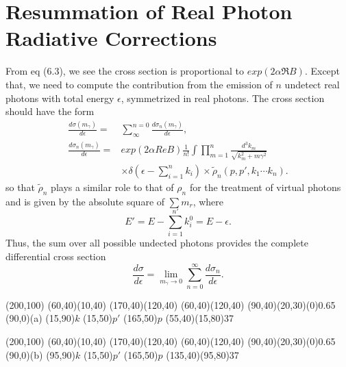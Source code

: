 \section{Resummation of Real Photon Radiative Corrections}
From eq (6.3), we see the cross section is proportional to $exp(2\alpha \Re B)$. Except that, we need to compute the contribution from the emission of $n$ undetect real photons with total energy $\epsilon$, symmetrized in real photons. The cross section should have the form 
\begin{align}
\frac{d \sigma(m_{\gamma})}{d\epsilon} =& \sum_{\infty}^{n=0}\frac{d \sigma_n(m_{\gamma})}{d\epsilon},\nonumber\\
\frac{d \sigma_n(m_{\gamma})}{d\epsilon} =& exp(2\alpha ReB)\frac{1}{n!}\int\prod_{m=1}^{n}\frac{d^3 k_m}{\sqrt{k_m^2+m{\gamma}^2}}\nonumber\\&\times \delta\left(\epsilon-\sum_{i=1}^{n}k_i\right)
\times \tilde{\rho}_n(p,p',k_1\cdots k_n).
\end{align}
so that  $\tilde{\rho}_n$ plays a similar role to that of $\rho_n$ for the treatment of virtual photons and  is given by the absolute square of $\sum m_r$, where
$$
E' = E - \sum_{i=1}^{n'}k_i^0 = E-\epsilon.
$$
Thus, the sum over all possible undected photons provides the complete differential cross section
\begin{equation}
\frac{d\sigma}{d\epsilon} = \lim_{m_\gamma\to 0}\sum_{n=0}^{\infty}\frac{d\sigma_n}{d\epsilon}.
\end{equation}
	\begin{center}
	\begin{axopicture}(200,100)
		\Line[arrow](60,40)(10,40)
		\Line[arrow](170,40)(120,40)
		\Line[arrow](60,40)(120,40)
		\GOval(90,40)(20,30)(0){0.65}
		\Text(90,0){(a)}
		\Text(15,90){$k$}
		\Text(15,50){$p'$} 	\Text(165,50){$p$}
		\Photon(55,40)(15,80){3}{7}
	\end{axopicture}                   
\end{center}


\begin{center}
	\begin{axopicture}(200,100)
		\Line[arrow](60,40)(10,40)
		\Line[arrow](170,40)(120,40)
		\Line[arrow](60,40)(120,40)
		\GOval(90,40)(20,30)(0){0.65}
		\Text(90,0){(b)}
		\Text(95,90){$k$}
		\Text(15,50){$p'$} 	\Text(165,50){$p$}
		\Photon(135,40)(95,80){3}{7}
	\end{axopicture}                   
\end{center}


